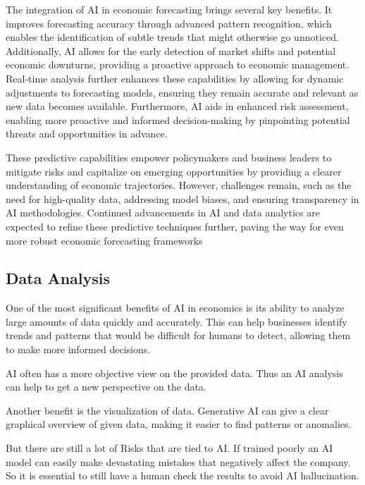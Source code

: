 The integration of AI in economic forecasting brings several key benefits. It improves forecasting accuracy through advanced pattern recognition, 
which enables the identification of subtle trends that might otherwise go unnoticed. Additionally, AI allows for the early detection of market shifts 
and potential economic downturns, providing a proactive approach to economic management. Real-time analysis further enhances these capabilities by 
allowing for dynamic adjustments to forecasting models, ensuring they remain accurate and relevant as new data becomes available. Furthermore, 
AI aids in enhanced risk assessment, enabling more proactive and informed decision-making by pinpointing potential threats and opportunities in advance.

These predictive capabilities empower policymakers and business leaders to mitigate risks and capitalize on emerging opportunities by providing a clearer understanding of economic trajectories. However, challenges remain, such as the need for high-quality data, addressing model biases, and ensuring transparency in AI methodologies. Continued advancements in AI and data analytics are expected to refine these predictive techniques further, paving the way for even more robust economic forecasting frameworks 

\cite{futur-econ-pre}


\subsection{Data Analysis}
\label{subsec:data-analysis}

One of the most significant benefits of AI in economics is its ability to analyze large amounts of data quickly and accurately. 
This can help businesses identify trends and patterns that would be difficult for humans to detect, allowing them to make more informed decisions.

AI often has a more objective view on the provided data. Thus an AI analysis can help to get a new perspective on the data. 

Another benefit is the visualization of data. Generative AI can give a clear graphical overview of given data, making it easier to find patterns or anomalies. 

But there are still a lot of Risks that are tied to AI.
If trained poorly an AI model can easily make devastating mistakes that negatively affect the company.
So it is essential to still have a human check the results to avoid AI hallucination.

